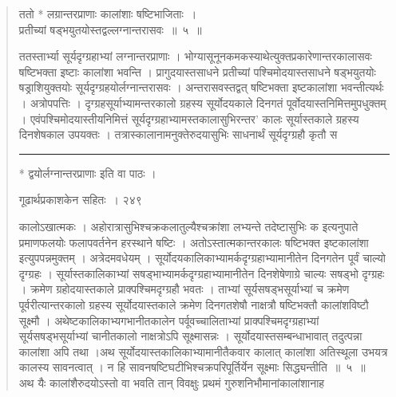 \documentclass[11pt, openany]{book}
\begin{document}
\begin{quote}
{\ssi ततो * लग्रान्तरप्राणाः कालांशाः षष्टिभाजिताः~।\\
 प्रतीच्यां षड्भयुतयोस्तद्वल्लग्नान्तरासवः~॥~५~॥ }


 ततस्तार्भ्या सूर्यदृग्ग्रहाभ्यां लग्नान्तरप्राणाः । भोग्यासूनूनकमकस्याथेत्युक्तप्रकारेणान्तरकालासवः षष्टिभक्ता इष्टाः कालांशा भवन्ति । प्रागुदयास्तसाधने प्रतीच्यां पश्चिमोदयास्तसाधने षड्भयुतयोः षड्राशियुक्तयोः सूर्यदृग्ग्रहयोर्लग्नान्तरासवः । अन्तरासवस्तद्वत् षष्टिभक्ता इष्टकालांशा भवन्तीत्यर्थः । अत्रोपपत्तिः । दृग्ग्रहसूर्याभ्यामन्तरकालो ग्रहस्य सूर्योदयकाले दिनगतं पूर्वोदयास्तनिमित्तमुपधुक्तम् । एवंपश्चिमोदयास्तीयनिमित्तं सूर्यदृग्ग्रहाभ्यामस्तकालासुभिरन्तर' कालः सूर्यास्तकाले ग्रहस्य दिनशेषकाल उपयक्तः । तत्रास्कालानामनुक्तेरुदयासुभिः साधनार्थं सूर्यदृग्ग्रहौ कृतौ स \textendash


\noindent\rule{\linewidth}{.5pt}
\begin{center}
 * द्वयोर्लग्नान्तरप्राणाः इति वा पाठः ।
\end{center}

\newpage

\hspace{3cm} गूढार्थप्रकाशकेन सहितः~। \hfill २४९
\vspace{1cm}


\noindent कालोऽखात्मकः । अहोरात्रासुभिश्चक्रकलातुल्यैश्चक्रांशा लभ्यन्ते तदेष्टासुभिः क इत्यनुपाते प्रमाणफलयोः फलापवर्तनेन हरस्थाने षष्टिः । अतोऽस्तात्मकान्तरकालः षष्टिभक्त इष्टकालांशा इत्युपपन्नमुक्तम् । अत्रेदमवधेयम् । सूर्योदयकालिकाभ्यामर्कदृग्ग्रहाभ्यामानीतेन दिनगतेन पूर्वं चाल्यो दृग्ग्रहः । सूर्यास्तकालिकाभ्यां सषड्भाभ्यामर्कदृग्ग्रहाभ्यामानीतेन दिनशेषेणाग्रे चाल्यः सषड्भो दृग्ग्रहः । क्रमेण ग्रहोदयास्तकाले प्राक्पश्चिमदृग्ग्रहौ भवतः । ताभ्यां सूर्यसषड्भसूर्याभ्यां च क्रमेण पूर्वरीत्यान्तरकालो ग्रहस्य सूर्योदयास्तकाले क्रमेण दिनगतशेषौ नाक्षत्रौ षष्टिभक्तौ कालांशविष्टौ सूक्ष्मौ । अथेष्टकालिकाभ्यगभानीतकालेन पर्वूवच्चालिताभ्यां प्राक्पश्चिमदृग्ग्रहाभ्यां सूर्यसषड्भसूर्याभ्यां चानीतकालो नाक्षत्रोऽपि सूक्ष्मासन्नः । सूर्योदयास्तसम्बन्धाभावात् तदुत्पन्ना कालांशा अपि तथा ।अथ सूर्योदयास्तकालिकाभ्यामानीतैकवार कालात् कालांशा अतिस्थूला उभयत्र कालस्य सावनत्वात् । न हि सावनषष्टिघटीभिश्चक्रपरिपूर्तिर्येन सूक्ष्माः सिद्ध्यन्तीति~॥~५~॥ \\
\noindent अथ यैः कालांशैरुदयोऽस्तो वा भवति तान् विवक्षुः प्रथमं गुरुशनिभौमानांकालांशानाह \textendash



\end{quote}
\end{document}
